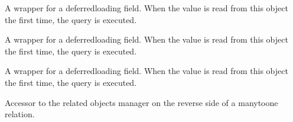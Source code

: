 \documentclass[letterpaper,10pt,french]{sphinxmanual}
\begin{document}
\begin{fulllineitems}
\begin{fulllineitems}
\end{fulllineitems}


\begin{fulllineitems}
\label{\detokenize{main/model:main.models.Etudiant.anneebac2}}
\pysigstartsignatures
{}
\pysigstopsignatures
\sphinxAtStartPar
A wrapper for a deferred\sphinxhyphen{}loading field. When the value is read from this
object the first time, the query is executed.

\end{fulllineitems}


\begin{fulllineitems}
\label{\detokenize{main/model:main.models.Etudiant.anneeentree}}
\pysigstartsignatures
{}
\pysigstopsignatures
\sphinxAtStartPar
A wrapper for a deferred\sphinxhyphen{}loading field. When the value is read from this
object the first time, the query is executed.

\end{fulllineitems}


\begin{fulllineitems}
\label{\detokenize{main/model:main.models.Etudiant.carte_identity}}
\pysigstartsignatures
{}
\pysigstopsignatures
\sphinxAtStartPar
A wrapper for a deferred\sphinxhyphen{}loading field. When the value is read from this
object the first time, the query is executed.

\end{fulllineitems}


\begin{fulllineitems}
\label{\detokenize{main/model:main.models.Etudiant.compteetudiant_set}}
\pysigstartsignatures
{}
\pysigstopsignatures
\sphinxAtStartPar
Accessor to the related objects manager on the reverse side of a
many\sphinxhyphen{}to\sphinxhyphen{}one relation.


\end{fulllineitems}
\end{fulllineitems}
\end{document}
